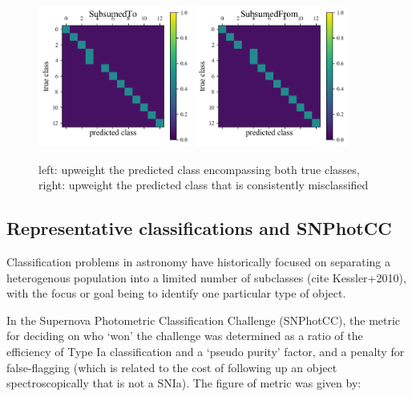 \begin{figure}
	\begin{center}
		\includegraphics[width=0.45\textwidth]{./fig/SubsumedTo.png}
		\includegraphics[width=0.45\textwidth]{./fig/SubsumedFrom.png}
		\caption{left: upweight the predicted class encompassing both true classes, right: upweight the predicted class that is consistently misclassified}
		\label{fig:subsume_data}
	\end{center}
\end{figure}

\subsection{Representative classifications and SNPhotCC}
\label{sec:realdata}

Classification problems in astronomy have historically focused on separating a heterogenous population into a limited number of subclasses (cite Kessler+2010), with the focus or goal being to identify one particular type of object.

In the Supernova Photometric Classification Challenge (SNPhotCC), the metric for deciding on who `won' the challenge was determined as a ratio of the efficiency of Type Ia classification and a `pseudo purity' factor, and a penalty for false-flagging (which is related to the cost of following up an object spectroscopically that is not a SNIa). The figure of metric was given by:

